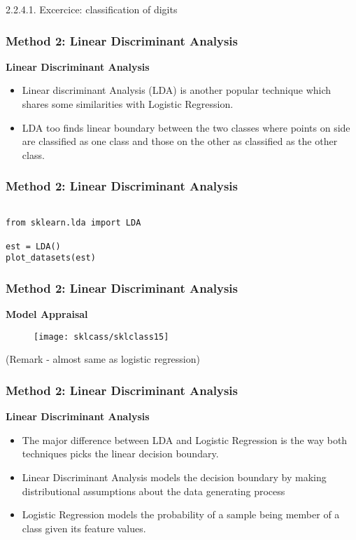 2.2.4.1. Excercice: classification of digits\documentclass[MASTER.tex]{subfiles}
\begin{document}

\frametitle{Method 2: Linear Discriminant Analysis}
\Large
\textbf{Linear Discriminant Analysis}
\begin{itemize}
\item Linear discriminant Analysis (LDA) is another popular technique which shares some similarities with Logistic Regression. 
\item LDA too finds linear boundary between the two classes where points on side are classified as one class and those on the other as classified as the other class.
\end{itemize}




\frametitle{Method 2: Linear Discriminant Analysis}	
\Large
\begin{framed}
\begin{verbatim}

from sklearn.lda import LDA

est = LDA()
plot_datasets(est)
		\end{verbatim}
	\end{framed}


\frametitle{Method 2: Linear Discriminant Analysis}
\textbf{Model Appraisal}
\begin{figure}
\centering
\texttt{[image: sklcass/sklclass15]}

\end{figure}
(Remark - almost same as logistic regression)


	\frametitle{Method 2: Linear Discriminant Analysis}
\Large
\textbf{Linear Discriminant Analysis}
\begin{itemize}
\item The major difference between LDA and Logistic Regression is the way both techniques picks the linear decision boundary.
\item  Linear Discriminant Analysis models the decision boundary by making distributional assumptions about the data generating process 
\item Logistic Regression models the probability of a sample being member of a class given its feature values.
\end{itemize}
\end{document}
